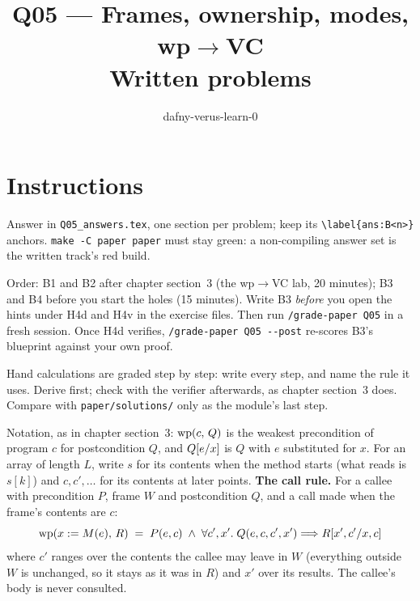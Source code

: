 \documentclass[11pt]{article}
\title{Q05 --- Frames, ownership, modes, wp$\to$VC \\ \large Written problems}
\author{dafny-verus-learn-0}
\date{}
\begin{document}
\maketitle

\section*{Instructions}
Answer in \texttt{Q05\_answers.tex}, one section per problem; keep its
\verb+\label{ans:B<n>}+ anchors. \texttt{make -C paper paper} must stay green:
a non-compiling answer set is the written track's red build.

Order: B1 and B2 after chapter section~3 (the wp$\to$VC lab, 20 minutes);
B3 and B4 before you start the holes (15 minutes). Write B3 \emph{before} you
open the hints under H4d and H4v in the exercise files. Then run
\texttt{/grade-paper Q05} in a fresh session. Once H4d verifies,
\verb+/grade-paper Q05 --post+ re-scores B3's blueprint against your own
proof.

Hand calculations are graded step by step: write every step, and name the rule
it uses. Derive first; check with the verifier afterwards, as chapter
section~3 does. Compare with \texttt{paper/solutions/} only as the module's
last step.

Notation, as in chapter section~3: $\WP{c}{Q}$ is the weakest precondition of
program $c$ for postcondition $Q$, and $\subst{Q}{x}{e}$ is $Q$ with $e$
substituted for $x$. For an array  of length $L$, write $s$ for its
contents when the method starts (what  reads is $s[k]$) and
$c, c', \ldots$ for its contents at later points. \textbf{The call rule.} For a
callee with precondition $P$, frame $W$ and postcondition $Q$, and a call
 made when the frame's contents are $c$:
\[
  \WP{x \assign M(e)}{R} \;=\; P(e, c) \;\wedge\;
  \forall c', x' .\; Q(e, c, c', x') \impl \subst{R}{x, c}{x', c'}
\]
where $c'$ ranges over the contents the callee may leave in $W$ (everything
outside $W$ is unchanged, so it stays as it was in $R$) and $x'$ over its
results. The callee's body is never consulted.
\end{document}
